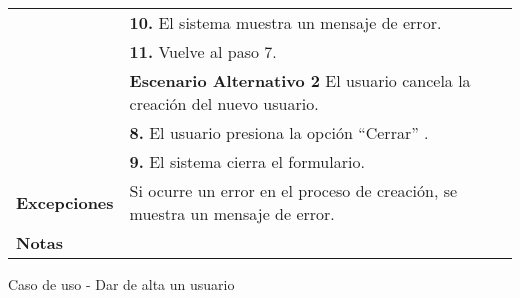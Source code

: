 \begin{analisisCasoDeUso}
\begin{tabular} { | m{3cm} | p{13cm} | }
		                            & {\bfseries 10.} El sistema muestra un mensaje de error.                                        \\
		                            & {\bfseries 11.} Vuelve al paso 7.                                                              \\
		                            & {\bfseries Escenario Alternativo 2} El usuario cancela la creación del nuevo usuario.          \\
		                            & {\bfseries 8.} El usuario presiona la opción “Cerrar” .                                         \\
		                            & {\bfseries 9.} El sistema cierra el formulario.                                                \\\hline
		{\bfseries Excepciones}     & Si ocurre un error en el proceso de creación, se muestra un mensaje de error.                  \\ \hline
		{\bfseries Notas }          &                                                                                                \\ \hline
	\end{tabular}
	\caption{Caso de uso - Dar de alta un usuario}
\end{analisisCasoDeUso}